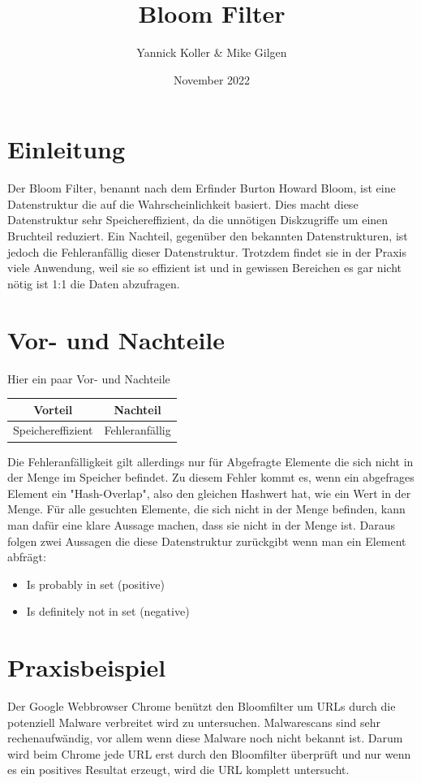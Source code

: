 \documentclass{article}
\title{Bloom Filter}
\author{ Yannick Koller & Mike Gilgen }
\date{November 2022}
\begin{document}
\maketitle

\section{Einleitung}
Der Bloom Filter, benannt nach dem Erfinder Burton Howard Bloom, ist eine Datenstruktur die auf die Wahrscheinlichkeit basiert. Dies macht diese Datenstruktur sehr Speichereffizient, da die unnötigen Diskzugriffe um einen Bruchteil reduziert. Ein Nachteil, gegenüber den bekannten Datenstrukturen, ist jedoch die Fehleranfällig dieser Datenstruktur. Trotzdem findet sie in der Praxis viele Anwendung, weil sie so effizient ist und in gewissen Bereichen es gar nicht nötig ist 1:1 die Daten abzufragen.

\section{Vor- und Nachteile}
Hier ein paar Vor- und Nachteile
\begin{center}
\begin{tabular}{c|c}
    Vorteil & Nachteil \\
    \hline
    Speichereffizient & Fehleranfällig \\
\end{tabular}
\end{center}
Die Fehleranfälligkeit gilt allerdings nur für Abgefragte Elemente die sich nicht in der Menge im Speicher befindet. Zu diesem Fehler kommt es, wenn ein abgefrages Element ein "Hash-Overlap", also den gleichen Hashwert hat, wie ein Wert in der Menge. Für alle gesuchten Elemente, die sich nicht in der Menge befinden, kann man dafür eine klare Aussage machen, dass sie nicht in der Menge ist. Daraus folgen zwei Aussagen die diese Datenstruktur zurückgibt wenn man ein Element abfrägt:

\begin{itemize}
    \item Is probably in set (positive)
    \item Is definitely not in set (negative)
\end{itemize}

\clearpage

\section{Praxisbeispiel}
Der Google Webbrowser Chrome benützt den Bloomfilter um URLs durch die potenziell Malware verbreitet wird zu untersuchen. Malwarescans sind sehr rechenaufwändig, vor allem wenn diese Malware noch nicht bekannt ist. Darum wird beim Chrome jede URL erst durch den Bloomfilter überprüft und nur wenn es ein positives Resultat erzeugt, wird die URL komplett untersucht.
\end{document}
